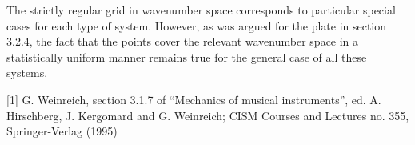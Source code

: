   The strictly regular grid in wavenumber space corresponds to particular 
  special cases for each type of system. However, as was argued for the plate 
  in section 3.2.4, the fact that the points cover the relevant wavenumber 
  space in a statistically uniform manner remains true for the general case of 
  all these systems. 

  \sectionreferences{}[1] G. Weinreich, section 3.1.7 of ``Mechanics of musical 
  instruments'', ed. A. Hirschberg, J. Kergomard and G. Weinreich; CISM Courses 
  and Lectures no. 355, Springer-Verlag (1995) 